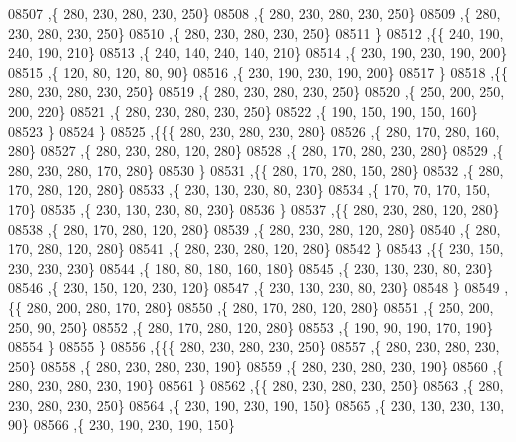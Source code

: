 \begin{DoxyCode}
08507     ,\{   280,   230,   280,   230,   250\}
08508     ,\{   280,   230,   280,   230,   250\}
08509     ,\{   280,   230,   280,   230,   250\}
08510     ,\{   280,   230,   280,   230,   250\}
08511     \}
08512    ,\{\{   240,   190,   240,   190,   210\}
08513     ,\{   240,   140,   240,   140,   210\}
08514     ,\{   230,   190,   230,   190,   200\}
08515     ,\{   120,    80,   120,    80,    90\}
08516     ,\{   230,   190,   230,   190,   200\}
08517     \}
08518    ,\{\{   280,   230,   280,   230,   250\}
08519     ,\{   280,   230,   280,   230,   250\}
08520     ,\{   250,   200,   250,   200,   220\}
08521     ,\{   280,   230,   280,   230,   250\}
08522     ,\{   190,   150,   190,   150,   160\}
08523     \}
08524    \}
08525   ,\{\{\{   280,   230,   280,   230,   280\}
08526     ,\{   280,   170,   280,   160,   280\}
08527     ,\{   280,   230,   280,   120,   280\}
08528     ,\{   280,   170,   280,   230,   280\}
08529     ,\{   280,   230,   280,   170,   280\}
08530     \}
08531    ,\{\{   280,   170,   280,   150,   280\}
08532     ,\{   280,   170,   280,   120,   280\}
08533     ,\{   230,   130,   230,    80,   230\}
08534     ,\{   170,    70,   170,   150,   170\}
08535     ,\{   230,   130,   230,    80,   230\}
08536     \}
08537    ,\{\{   280,   230,   280,   120,   280\}
08538     ,\{   280,   170,   280,   120,   280\}
08539     ,\{   280,   230,   280,   120,   280\}
08540     ,\{   280,   170,   280,   120,   280\}
08541     ,\{   280,   230,   280,   120,   280\}
08542     \}
08543    ,\{\{   230,   150,   230,   230,   230\}
08544     ,\{   180,    80,   180,   160,   180\}
08545     ,\{   230,   130,   230,    80,   230\}
08546     ,\{   230,   150,   120,   230,   120\}
08547     ,\{   230,   130,   230,    80,   230\}
08548     \}
08549    ,\{\{   280,   200,   280,   170,   280\}
08550     ,\{   280,   170,   280,   120,   280\}
08551     ,\{   250,   200,   250,    90,   250\}
08552     ,\{   280,   170,   280,   120,   280\}
08553     ,\{   190,    90,   190,   170,   190\}
08554     \}
08555    \}
08556   ,\{\{\{   280,   230,   280,   230,   250\}
08557     ,\{   280,   230,   280,   230,   250\}
08558     ,\{   280,   230,   280,   230,   190\}
08559     ,\{   280,   230,   280,   230,   190\}
08560     ,\{   280,   230,   280,   230,   190\}
08561     \}
08562    ,\{\{   280,   230,   280,   230,   250\}
08563     ,\{   280,   230,   280,   230,   250\}
08564     ,\{   230,   190,   230,   190,   150\}
08565     ,\{   230,   130,   230,   130,    90\}
08566     ,\{   230,   190,   230,   190,   150\}

\end{DoxyCode}
